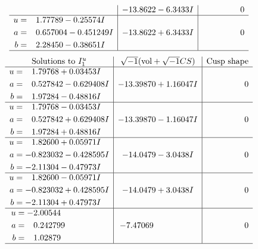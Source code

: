 \documentclass[1p]{elsarticle_modified}
\theoremstyle{definition}
\newcommand{\I}{\sqrt{-1}}
\begin{document}
$$\begin{array}{c|c|c}
 & -13.8622 - 6.3433 I & \phantom{-0.000000 } 0 \\ \hline\begin{aligned}
u &= \phantom{-}1.77789 - 0.25574 I \\
a &= \phantom{-}0.657004 - 0.451249 I \\
b &= \phantom{-}2.28450 - 0.38651 I\end{aligned}
 & -13.8622 + 6.3433 I & \phantom{-0.000000 } 0\\
 \hline 
 \end{array}$$\newpage$$\begin{array}{c|c|c}  
\text{Solutions to }I^u_{1}& \I (\text{vol} + \sqrt{-1}CS) & \text{Cusp shape}\\
 \hline 
\begin{aligned}
u &= \phantom{-}1.79768 + 0.03453 I \\
a &= \phantom{-}0.527842 - 0.629408 I \\
b &= \phantom{-}1.97284 - 0.48816 I\end{aligned}
 & -13.39870 + 1.16047 I & \phantom{-0.000000 } 0 \\ \hline\begin{aligned}
u &= \phantom{-}1.79768 - 0.03453 I \\
a &= \phantom{-}0.527842 + 0.629408 I \\
b &= \phantom{-}1.97284 + 0.48816 I\end{aligned}
 & -13.39870 - 1.16047 I & \phantom{-0.000000 } 0 \\ \hline\begin{aligned}
u &= \phantom{-}1.82600 + 0.05971 I \\
a &= -0.823032 - 0.428595 I \\
b &= -2.11304 - 0.47973 I\end{aligned}
 & -14.0479 - 3.0438 I & \phantom{-0.000000 } 0 \\ \hline\begin{aligned}
u &= \phantom{-}1.82600 - 0.05971 I \\
a &= -0.823032 + 0.428595 I \\
b &= -2.11304 + 0.47973 I\end{aligned}
 & -14.0479 + 3.0438 I & \phantom{-0.000000 } 0 \\ \hline\begin{aligned}
u &= -2.00544\phantom{ +0.000000I} \\
a &= \phantom{-}0.242799\phantom{ +0.000000I} \\
b &= \phantom{-}1.02879\phantom{ +0.000000I}\end{aligned}
 & -7.47069\phantom{ +0.000000I} & \phantom{-0.000000 } 0\\
 \hline 
 \end{array}$$\newpage\newpage\renewcommand{\arraystretch}{1}
\end{document}

